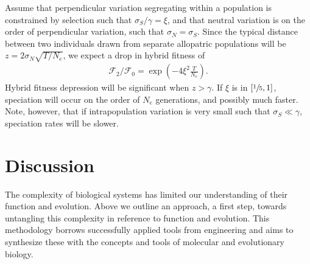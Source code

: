 \documentclass{article}
\newcommand{\jss}[1]{{\color{olive}\it #1}}
\newcommand{\1}{\mathbbm{1}}
\newcommand{\fit}{\mathcal{F}}
\begin{document}
  Assume that perpendicular variation segregating within a population is constrained by selection such that $\sigma_S/\gamma = \xi$, and that neutral variation is on the order of perpendicular variation, such that $\sigma_N = \sigma_S$. Since the typical distance between two individuals drawn from separate allopatric populations will be $z = 2 \sigma_N \sqrt{T/N_e}$, we expect a drop in hybrid fitness of
  \begin{align}
  \fit_2/\fit_0 = \exp \left(- 4\xi^2 \frac{T}{N_e} \right) .
  \end{align}
  Hybrid fitness depression will be significant when $z > \gamma$. 
  If $\xi$ is in $[\sfrac{1}{5},1]$, speciation will occur on the order of $N_e$ generations, and possibly much faster. Note, however, that if intrapopulation variation is very small such that $\sigma_S \ll \gamma$, speciation rates will be slower.


\section*{Discussion}
%
%
The complexity of biological systems has limited our understanding of their function and evolution. Above we outline an approach, a first step, towards untangling this complexity in reference to function and evolution. This methodology borrows successfully applied tools from engineering and aims to synthesize these with the concepts and tools of molecular and evolutionary biology. 
\end{document}
